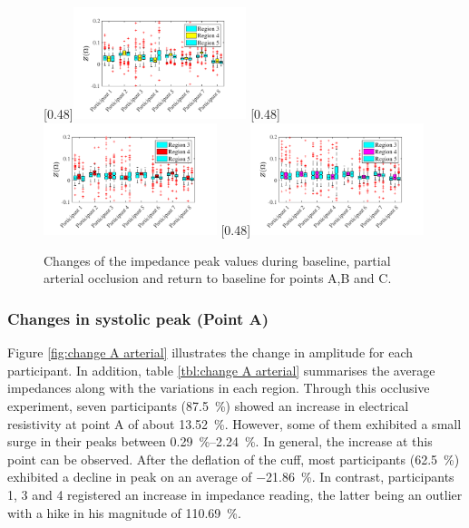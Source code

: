 \begin{figure}
	\null\hfill%
	[0.48\textwidth]{\includegraphics[width=0.45\textwidth, trim={0.5cm 0cm 1.5cm 0 cm}, clip]{figure_apa_5a}}%
	\hfill%
	[0.48\textwidth]{\includegraphics[width=0.45\textwidth, trim={0.5cm 0cm 1.5cm 0 cm}, clip]{figure_apa_5b}}%
	\hfill%
	[0.48\textwidth]{\includegraphics[width=0.45\textwidth, trim={0.5cm 0cm 1.5cm 0 cm}, clip]{figure_apa_5c}}%
	\null%
	\caption{Changes of the impedance peak values during baseline, partial arterial occlusion and return to baseline for points A,B and C.}
	\label{fig:iPG change points arterial}
\end{figure}

\subsubsection{Changes in systolic peak (Point A)}
\label{section apa 2.2.1}
Figure \ref{fig:change A arterial} illustrates the change in amplitude for each participant. In addition, table \ref{tbl:change A arterial} summarises the average impedances along with the variations in each region. Through this occlusive experiment, seven participants (\SI{87.5}{\percent}) showed an increase in electrical resistivity at point A of about \SI{13.52}{\percent}. However, some of them exhibited a small surge in their peaks between \SIrange{0.29}{2.24}{\percent}. In general, the increase at this point can be observed. After the deflation of the cuff, most participants (\SI{62.5}{\percent}) exhibited a decline in peak on an average of \SI{-21.86}{\percent}.  In contrast, participants 1, 3 and 4 registered an increase in impedance reading, the latter being an outlier with a hike in his magnitude of \SI{110.69}{\percent}.

